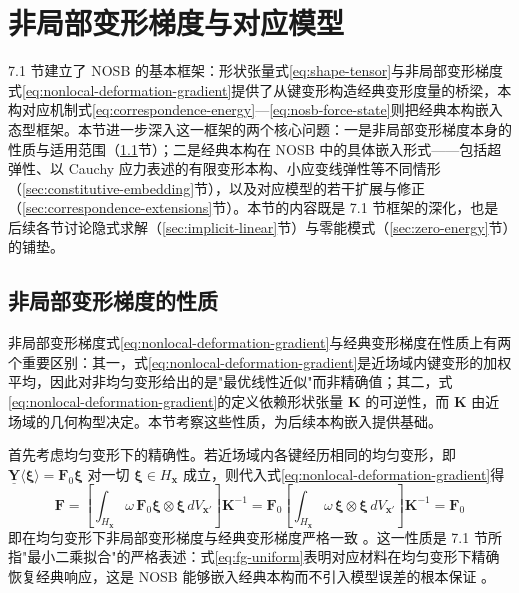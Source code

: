 \section{非局部变形梯度与对应模型}\label{sec:nosb-deformation-gradient}

7.1 节建立了 NOSB 的基本框架：形状张量式\eqref{eq:shape-tensor}与非局部变形梯度式\eqref{eq:nonlocal-deformation-gradient}提供了从键变形构造经典变形度量的桥梁，本构对应机制式\eqref{eq:correspondence-energy}—\eqref{eq:nosb-force-state}则把经典本构嵌入态型框架。本节进一步深入这一框架的两个核心问题：一是非局部变形梯度本身的性质与适用范围（\ref{sec:fg-properties}节）；二是经典本构在 NOSB 中的具体嵌入形式——包括超弹性、以 Cauchy 应力表述的有限变形本构、小应变线弹性等不同情形（\ref{sec:constitutive-embedding}节），以及对应模型的若干扩展与修正（\ref{sec:correspondence-extensions}节）。本节的内容既是 7.1 节框架的深化，也是后续各节讨论隐式求解（\ref{sec:implicit-linear}节）与零能模式（\ref{sec:zero-energy}节）的铺垫。

\subsection{非局部变形梯度的性质}\label{sec:fg-properties}

非局部变形梯度式\eqref{eq:nonlocal-deformation-gradient}与经典变形梯度在性质上有两个重要区别：其一，式\eqref{eq:nonlocal-deformation-gradient}是近场域内键变形的加权平均，因此对非均匀变形给出的是"最优线性近似"而非精确值；其二，式\eqref{eq:nonlocal-deformation-gradient}的定义依赖形状张量 $\mathbf{K}$ 的可逆性，而 $\mathbf{K}$ 由近场域的几何构型决定。本节考察这些性质，为后续本构嵌入提供基础。

首先考虑均匀变形下的精确性。若近场域内各键经历相同的均匀变形，即 $\underline{\mathbf{Y}}\langle\boldsymbol{\xi}\rangle=\mathbf{F}_{0}\boldsymbol{\xi}$ 对一切 $\boldsymbol{\xi}\in H_{\mathbf{x}}$ 成立，则代入式\eqref{eq:nonlocal-deformation-gradient}得
\begin{equation}
  \mathbf{F}=\left[\int_{H_{\mathbf{x}}}\omega\,\mathbf{F}_{0}\boldsymbol{\xi}\otimes\boldsymbol{\xi}\,dV_{\mathbf{x}'}\right]\mathbf{K}^{-1}
  =\mathbf{F}_{0}\left[\int_{H_{\mathbf{x}}}\omega\,\boldsymbol{\xi}\otimes\boldsymbol{\xi}\,dV_{\mathbf{x}'}\right]\mathbf{K}^{-1}
  =\mathbf{F}_{0}
  \label{eq:fg-uniform}
\end{equation}
即在均匀变形下非局部变形梯度与经典变形梯度严格一致 \cite{Silling2007}。这一性质是 7.1 节所指"最小二乘拟合"的严格表述：式\eqref{eq:fg-uniform}表明对应材料在均匀变形下精确恢复经典响应，这是 NOSB 能够嵌入经典本构而不引入模型误差的根本保证 \cite{Silling2007,SillingLehoucq2010}。

